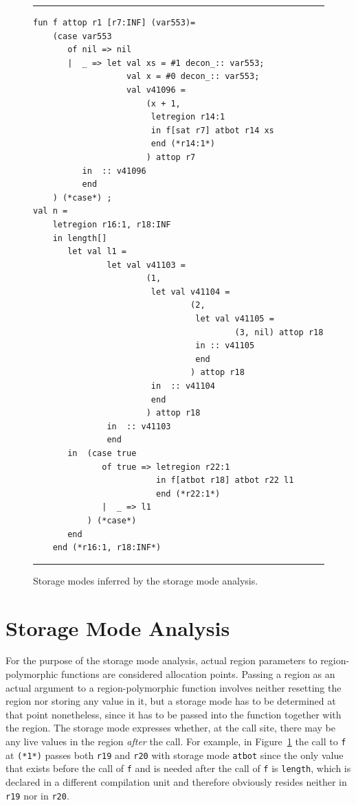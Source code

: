 \documentclass[12pt]{book}
\begin{document}
\begin{figure}
\hrule \medskip
\begin{verbatim}
fun f attop r1 [r7:INF] (var553)= 
    (case var553 
       of nil => nil
       |  _ => let val xs = #1 decon_:: var553; 
                   val x = #0 decon_:: var553; 
                   val v41096 = 
                       (x + 1, 
                        letregion r14:1 
                        in f[sat r7] atbot r14 xs 
                        end (*r14:1*)
                       ) attop r7
          in  :: v41096
          end 
    ) (*case*) ; 
val n = 
    letregion r16:1, r18:INF 
    in length[] 
       let val l1 = 
               let val v41103 = 
                       (1, 
                        let val v41104 = 
                                (2, 
                                 let val v41105 = 
                                         (3, nil) attop r18 
                                 in :: v41105 
                                 end 
                                ) attop r18
                        in  :: v41104
                        end 
                       ) attop r18
               in  :: v41103
               end 
       in  (case true 
              of true => letregion r22:1 
                         in f[atbot r18] atbot r22 l1 
                         end (*r22:1*)
              |  _ => l1
           ) (*case*) 
       end  
    end (*r16:1, r18:INF*)
\end{verbatim}
\caption{Storage modes inferred by the storage mode analysis.}
\label{sma1.fig}
\medskip
\hrule
\end{figure}

\section{Storage Mode Analysis}
\label{sma.sec}
For the purpose of the storage mode analysis, actual region
parameters to region-polymorphic functions are considered allocation
points. Passing a region as an actual argument to a region-polymorphic
function involves neither resetting the region nor storing any value
in it, but a storage mode has to be determined at that point
nonetheless, since it has to be passed into the function together with
the region. The storage mode expresses whether, at the call site,
there may be any live values in the region {\em after} the call. For
example, in Figure~\ref{sma1.fig} the call to {\tt f}
at {\tt (*1*)} passes both {\tt r19} and {\tt r20} with storage
mode {\tt atbot} since the only value that exists before the call
of {\tt f} and is needed after the call of {\tt f} is {\tt length},
which is declared in a different compilation unit and therefore
obviously  resides neither in {\tt r19} nor in {\tt r20}.
\end{document}
